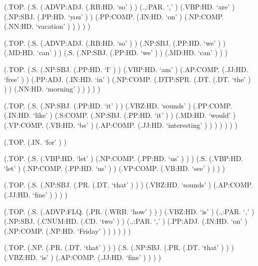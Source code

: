 \documentclass[10pt]{article}
\begin{document}
\begin{parsetree}  (.TOP. (.S. (.ADVP:ADJ. (.RB:HD. `so' ) ) (.,:PAR. `,' ) (.VBP:HD. `are' ) (.NP:SBJ. (.PP:HD. `you' ) ) (.PP:COMP. (.IN:HD. `on' ) (.NP:COMP. (.NN:HD. `vacation' ) ) ) ) ) \end{parsetree}

\begin{parsetree}  (.TOP. (.S. (.ADVP:ADJ. (.RB:HD. `so' ) ) (.NP:SBJ. (.PP:HD. `we' ) ) (.MD:HD. `can' ) ) (.S. (.NP:SBJ. (.PP:HD. `we' ) ) (.MD:HD. `can' ) ) ) \end{parsetree}

\begin{parsetree}  (.TOP. (.S. (.NP:SBJ. (.PP:HD. `I' ) ) (.VBP:HD. `am' ) (.AP:COMP. (.JJ:HD. `free' ) ) (.PP:ADJ. (.IN:HD. `in' ) (.NP:COMP. (.DTP:SPR. (.DT. (.DT. `the' ) ) ) (.NN:HD. `morning' ) ) ) ) ) \end{parsetree}

\begin{parsetree}  (.TOP. (.S. (.NP:SBJ. (.PP:HD. `it' ) ) (.VBZ:HD. `sounds' ) (.PP:COMP. (.IN:HD. `like' ) (.S:COMP. (.NP:SBJ. (.PP:HD. `it' ) ) (.MD:HD. `would' ) (.VP:COMP. (.VB:HD. `be' ) (.AP:COMP. (.JJ:HD. `interesting' ) ) ) ) ) ) ) \end{parsetree}

\begin{parsetree}  (.TOP. (.IN. `for' ) ) \end{parsetree}

\begin{parsetree}  (.TOP. (.S. (.VBP:HD. `let' ) (.NP:COMP. (.PP:HD. `us' ) ) ) (.S. (.VBP:HD. `let' ) (.NP:COMP. (.PP:HD. `us' ) ) (.VP:COMP. (.VB:HD. `see' ) ) ) ) \end{parsetree}

\begin{parsetree}  (.TOP. (.S. (.NP:SBJ. (.PR. (.DT. `that' ) ) ) (.VBZ:HD. `sounds' ) (.AP:COMP. (.JJ:HD. `fine' ) ) ) ) \end{parsetree}

\begin{parsetree}  (.TOP. (.S. (.ADVP:FLQ. (.PR. (.WRB. `how' ) ) ) (.VBZ:HD. `is' ) (.,:PAR. `,' ) (.NP:SBJ. (.CNUM:HD. (.CD. `two' ) ) (.,:PAR. `,' ) (.PP:ADJ. (.IN:HD. `on' ) (.NP:COMP. (.NP:HD. `Friday' ) ) ) ) ) ) \end{parsetree}

\begin{parsetree}  (.TOP. (.NP. (.PR. (.DT. `that' ) ) ) (.S. (.NP:SBJ. (.PR. (.DT. `that' ) ) ) (.VBZ:HD. `is' ) (.AP:COMP. (.JJ:HD. `fine' ) ) ) ) \end{parsetree}
\end{document}
